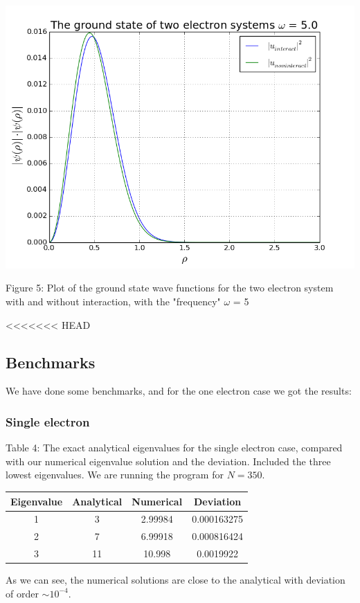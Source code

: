 \documentclass[norsk,a4paper,12pt]{article}
\begin{document}
\includegraphics[scale=0.6]{wavefunc_two_omega=5}\par
\vspace{1mm}
Figure 5:  Plot of the ground state wave functions for the two electron system with and without interaction, with the "frequency" $\omega$ = 5
\par
\vspace{7mm}

<<<<<<< HEAD
\subsection{Benchmarks}
We have done some benchmarks, and for the one electron case we got the results:
\subsubsection{Single electron}
Table 4: The exact analytical eigenvalues for the single electron case, compared with our numerical eigenvalue solution and the deviation. Included the three lowest eigenvalues. We are running the program for $N=350$.\par\vspace{5mm}
\begin{tabular}{|c|c|c|c|}\hline
     {\bf Eigenvalue} & {\bf Analytical} & {\bf Numerical} & {\bf Deviation}\\ \hline
     1 & 3 & 2.99984 & 0.000163275\\
     2 & 7 & 6.99918 & 0.000816424\\
     3 & 11 & 10.998 & 0.0019922\\ \hline
\end{tabular}\par\vspace{5mm}
As we can see, the numerical solutions are close to the analytical with deviation of order $\sim 10^{-4}$. 
\end{document}
